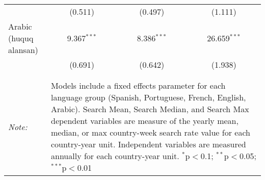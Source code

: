\begin{table}[!htbp]
\begin{tabular}{@{\extracolsep{5pt}}lccc}
  & (0.511) & (0.497) & (1.111) \\ 
  Arabic (huquq alansan) & 9.367$^{***}$ & 8.386$^{***}$ & 26.659$^{***}$ \\ 
  & (0.691) & (0.642) & (1.938) \\ 
 \hline \\[-1.8ex] 
\hline 
\hline \\[-1.8ex] 
\textit{Note:}  & \multicolumn{3}{l}{\parbox[t]{8cm}{Models include a fixed effects parameter for each language group (Spanish, Portuguese, French, English, Arabic). Search Mean, Search Median, and Search Max dependent variables are measure of the yearly mean, median, or max country-week search rate value for each country-year unit. Independent variables are measured annually for each country-year unit. $^{*}$p$<$0.1; $^{**}$p$<$0.05; $^{***}$p$<$0.01}} \\ 
\end{tabular} 
\end{table} 
